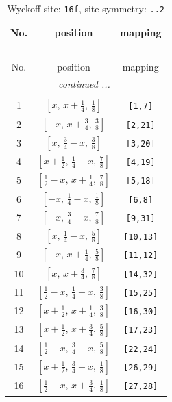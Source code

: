 \documentclass[fleqn,8pt]{jsarticle}
\begin{document}
\renewcommand{\arraystretch}{1.2}
\begin{longtable}{ccc}
\caption{Wyckoff site: {\tt 16f}, site symmetry: {\tt ..2}}
 \\
 \hline \hline
No. & position & mapping \\ \hline \endfirsthead

\multicolumn{2}{l}{\tablename\ \thetable{}} \\
 \hline \hline
No. & position & mapping \\ \hline \endhead

 \hline \hline
\multicolumn{2}{r}{\footnotesize\it continued ...} \\ \endfoot

 \hline \hline
\multicolumn{2}{r}{} \\ \endlastfoot

1 & $\left[ x,\, x + \frac{1}{4},\, \frac{1}{8} \right]$ & {\tt [1,7]} \\ \hline
2 & $\left[ - x,\, x + \frac{3}{4},\, \frac{3}{8} \right]$ & {\tt [2,21]} \\ \hline
3 & $\left[ x,\, \frac{3}{4} - x,\, \frac{3}{8} \right]$ & {\tt [3,20]} \\ \hline
4 & $\left[ x + \frac{1}{2},\, \frac{1}{4} - x,\, \frac{7}{8} \right]$ & {\tt [4,19]} \\ \hline
5 & $\left[ \frac{1}{2} - x,\, x + \frac{1}{4},\, \frac{7}{8} \right]$ & {\tt [5,18]} \\ \hline
6 & $\left[ - x,\, \frac{1}{4} - x,\, \frac{1}{8} \right]$ & {\tt [6,8]} \\ \hline
7 & $\left[ - x,\, \frac{3}{4} - x,\, \frac{7}{8} \right]$ & {\tt [9,31]} \\ \hline
8 & $\left[ x,\, \frac{1}{4} - x,\, \frac{5}{8} \right]$ & {\tt [10,13]} \\ \hline
9 & $\left[ - x,\, x + \frac{1}{4},\, \frac{5}{8} \right]$ & {\tt [11,12]} \\ \hline
10 & $\left[ x,\, x + \frac{3}{4},\, \frac{7}{8} \right]$ & {\tt [14,32]} \\ \hline
11 & $\left[ \frac{1}{2} - x,\, \frac{1}{4} - x,\, \frac{3}{8} \right]$ & {\tt [15,25]} \\ \hline
12 & $\left[ x + \frac{1}{2},\, x + \frac{1}{4},\, \frac{3}{8} \right]$ & {\tt [16,30]} \\ \hline
13 & $\left[ x + \frac{1}{2},\, x + \frac{3}{4},\, \frac{5}{8} \right]$ & {\tt [17,23]} \\ \hline
14 & $\left[ \frac{1}{2} - x,\, \frac{3}{4} - x,\, \frac{5}{8} \right]$ & {\tt [22,24]} \\ \hline
15 & $\left[ x + \frac{1}{2},\, \frac{3}{4} - x,\, \frac{1}{8} \right]$ & {\tt [26,29]} \\ \hline
16 & $\left[ \frac{1}{2} - x,\, x + \frac{3}{4},\, \frac{1}{8} \right]$ & {\tt [27,28]} \\
\end{longtable}
\end{document}
